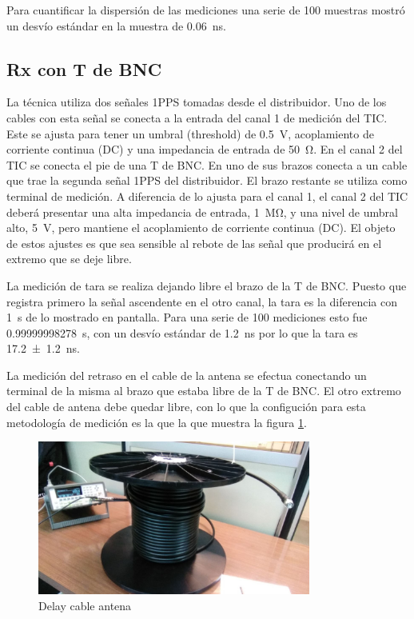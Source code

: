 \documentclass[11pt]{article}
\begin{document}
Para cuantificar la dispersión de las mediciones una serie de 100 muestras mostró un desvío estándar en la muestra de \SI{0.06}{\nano\second}.




\subsection{Rx con T de BNC}\label{sec:Rx}

La técnica utiliza dos señales 1PPS tomadas desde el distribuidor.
Uno de los cables con esta señal se conecta a la entrada del canal 1 de medición del TIC.
Este se ajusta para tener un umbral (threshold) de \SI{0.5}{\volt}, acoplamiento de corriente continua (DC) y una impedancia de entrada de \SI{50}{\ohm}.
En el canal 2 del TIC se conecta el pie de una T de BNC.
En uno de sus brazos conecta a un cable que trae la segunda señal 1PPS del distribuidor.
El brazo restante se utiliza como terminal de medición.
A diferencia de lo ajusta para el canal 1, el canal 2 del TIC deberá presentar una alta impedancia de entrada, \SI{1}{\mega\ohm}, y una nivel de umbral alto, \SI{5}{\volt}, pero mantiene el acoplamiento de corriente continua (DC).
El objeto de estos ajustes es que sea sensible al rebote de las señal que producirá en el extremo que se deje libre.

La medición de tara se realiza dejando libre el brazo de la T de BNC.
Puesto que registra primero la señal ascendente en el otro canal, la tara es la diferencia con \SI{1}{\second} de lo mostrado en pantalla.
Para una serie de 100 mediciones esto fue \SI{0.99999998278}{\second}, con un desvío estándar de \SI{1.2}{\nano\second} por lo que la tara es \SI{17.2\pm1.2}{\nano\second}.

La medición del retraso en el cable de la antena se efectua conectando un terminal de la misma al brazo que estaba libre de la T de BNC.
El otro extremo del cable de antena debe quedar libre, con lo que la configución para esta metodología de medición es la que la que muestra la figura \ref{fig:RxRovera}.

\begin{figure}[ht]
    \begin{center}
        \includegraphics[width=0.8\textwidth]{./figuras/4.jpg}
        \caption{Delay cable antena}
        \label{fig:RxRovera}
    \end{center}
\end{figure}
\end{document}
